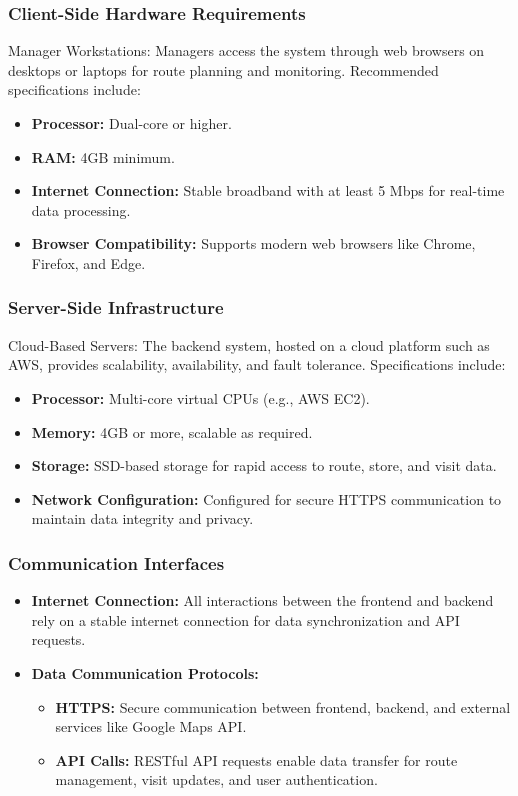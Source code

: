 \subsubsection{Client-Side Hardware Requirements}
Manager Workstations: Managers access the system through web browsers on desktops or laptops for route planning and monitoring. Recommended specifications include:
\begin{itemize}
    \item \textbf{Processor:} Dual-core or higher.
    \item \textbf{RAM:} 4GB minimum.
    \item \textbf{Internet Connection:} Stable broadband with at least 5 Mbps for real-time data processing.
    \item \textbf{Browser Compatibility:} Supports modern web browsers like Chrome, Firefox, and Edge.
\end{itemize}

\subsubsection{Server-Side Infrastructure}
Cloud-Based Servers: The backend system, hosted on a cloud platform such as AWS, provides scalability, availability, and fault tolerance. Specifications include:
\begin{itemize}
    \item \textbf{Processor:} Multi-core virtual CPUs (e.g., AWS EC2).
    \item \textbf{Memory:} 4GB or more, scalable as required.
    \item \textbf{Storage:} SSD-based storage for rapid access to route, store, and visit data.
    \item \textbf{Network Configuration:} Configured for secure HTTPS communication to maintain data integrity and privacy.
\end{itemize}

\subsubsection{Communication Interfaces}
\begin{itemize}
    \item \textbf{Internet Connection:} All interactions between the frontend and backend rely on a stable internet connection for data synchronization and API requests.
\newpage
    \item \textbf{Data Communication Protocols:}
    \begin{itemize}
        \item \textbf{HTTPS:} Secure communication between frontend, backend, and external services like Google Maps API.
        \item \textbf{API Calls:} RESTful API requests enable data transfer for route management, visit updates, and user authentication.
    \end{itemize}
\end{itemize}

